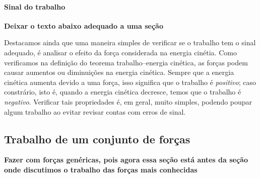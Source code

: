 \paragraph{Sinal do trabalho}

\textbf{Deixar o texto abaixo adequado a uma seção}

Destacamos ainda que uma maneira simples de verificar se o trabalho tem o sinal adequado, é analisar o efeito da força considerada na energia cinétia. Como verificamos na definição do teorema trabalho--energia cinética, as forças podem causar aumentos ou diminuições na energia cinética. Sempre que a energia cinética aumenta devido a uma força, isso significa que o trabalho é \emph{positivo}; caso constrário, isto é, quando a energia cinética decresce, temos que o trabalho é \emph{negativo}. Verificar tais propriedades é, em geral, muito simples, podendo poupar algum trabalho ao evitar revisar contas com erros de sinal.

\subsection{Trabalho de um conjunto de forças}

\textbf{Fazer com forças genéricas, pois agora essa seção está antes da seção onde discutimos o trabalho das forças mais conhecidas}

